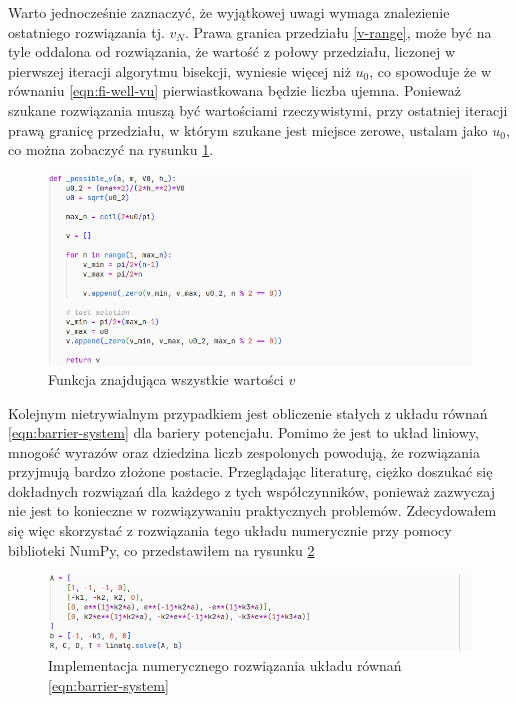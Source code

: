 \documentclass{SGGW-thesis}
\begin{document}
Warto jednocześnie zaznaczyć, że wyjątkowej uwagi wymaga znalezienie ostatniego rozwiązania tj. $v_N$. Prawa granica przedziału \ref{v-range}, może być na tyle oddalona od rozwiązania, że wartość z połowy przedziału, liczonej w pierwszej iteracji algorytmu bisekcji, wyniesie więcej niż $u_0$, co spowoduje że w równaniu \ref{eqn:fi-well-vu} pierwiastkowana będzie liczba ujemna. Ponieważ szukane rozwiązania muszą być wartościami rzeczywistymi, przy ostatniej iteracji prawą granicę przedziału, w którym szukane jest miejsce zerowe, ustalam jako $u_0$, co można zobaczyć na rysunku \ref{fig:bisection2}.
	\begin{figure}[H]
		\includegraphics[width=\textwidth,height=\textheight,keepaspectratio]{bisection2.png} 
		\caption{Funkcja znajdująca wszystkie wartości $v$}
		\label{fig:bisection2}
	\end{figure}
	
	Kolejnym nietrywialnym przypadkiem jest obliczenie stałych z układu równań \ref{eqn:barrier-system} dla bariery potencjału. Pomimo że jest to układ liniowy, mnogość wyrazów oraz dziedzina liczb zespolonych powodują, że rozwiązania przyjmują bardzo złożone postacie. Przeglądając literaturę, ciężko doszukać się dokładnych rozwiązań dla każdego z tych współczynników, ponieważ zazwyczaj nie jest to konieczne w rozwiązywaniu praktycznych problemów\cite{fiz atom}\cite{mechanika kwant}\cite{fiz kwant}. Zdecydowałem się więc skorzystać z rozwiązania tego układu numerycznie przy pomocy biblioteki NumPy, co przedstawiłem na rysunku \ref{fig:linalg-solve}
	
	\begin{figure}[H]
		\includegraphics[width=\textwidth,height=\textheight,keepaspectratio]{linalg solve.png} 
		\caption{Implementacja numerycznego rozwiązania układu równań \ref{eqn:barrier-system}}
		\label{fig:linalg-solve}
	\end{figure}
\end{document}
